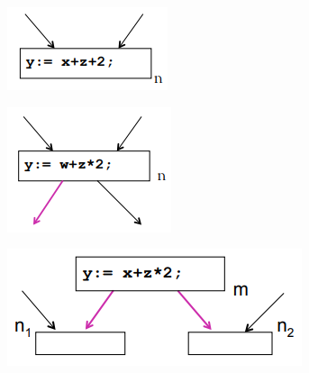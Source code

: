 \documentclass[a4paper,oneside,titlepage]{book}
\begin{document}
\begin{figure}[htp]
	\begin{subfigure}{0.3\textwidth}
        \centering
        \includegraphics[width=\textwidth, height=\textheight, keepaspectratio]{compLiv1.png}
        \caption{}
    \end{subfigure}
    \hfill
    \begin{subfigure}{0.3\textwidth}
        \centering
        \includegraphics[width=\textwidth, height=\textheight, keepaspectratio]{compLiv2.png}
        \caption{}
    \end{subfigure}
    \hfill
    \begin{subfigure}{0.3\textwidth}
        \centering
        \includegraphics[width=\textwidth, height=\textheight, keepaspectratio]{compLiv3.png}
        \caption{}
    \end{subfigure}
\end{figure}
\end{document}
